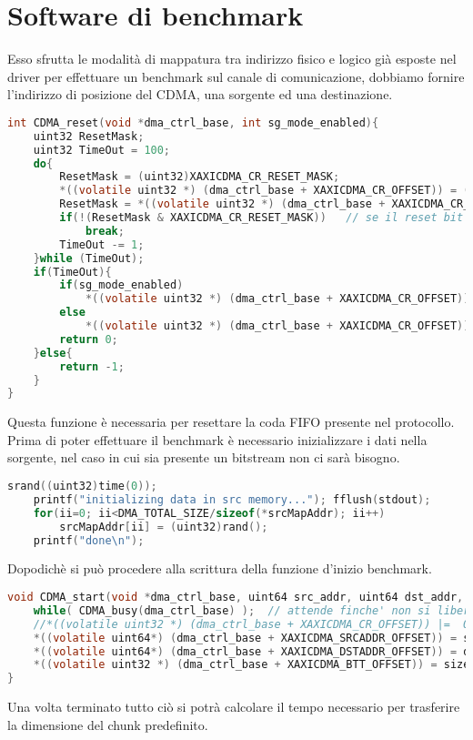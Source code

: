 \section{Software di benchmark}
\label{benchmark}
Esso sfrutta le modalità di mappatura tra indirizzo fisico e logico già esposte nel driver per effettuare un benchmark sul canale di comunicazione, dobbiamo fornire l'indirizzo di posizione del CDMA, una sorgente ed una destinazione.
\begin{lstlisting}[language=c, label=lst:sh, caption={reset CDMA}]
int CDMA_reset(void *dma_ctrl_base, int sg_mode_enabled){
    uint32 ResetMask;
    uint32 TimeOut = 100;
    do{
        ResetMask = (uint32)XAXICDMA_CR_RESET_MASK;
        *((volatile uint32 *) (dma_ctrl_base + XAXICDMA_CR_OFFSET)) = (uint32)ResetMask;
        ResetMask = *((volatile uint32 *) (dma_ctrl_base + XAXICDMA_CR_OFFSET));
        if(!(ResetMask & XAXICDMA_CR_RESET_MASK))   // se il reset bit e' 1 non e' ancora pronto
            break;
        TimeOut -= 1;
    }while (TimeOut);
    if(TimeOut){
        if(sg_mode_enabled)
            *((volatile uint32 *) (dma_ctrl_base + XAXICDMA_CR_OFFSET)) |=  0x00000008;
        else
            *((volatile uint32 *) (dma_ctrl_base + XAXICDMA_CR_OFFSET)) &= ~0x00000008;
        return 0;
    }else{
        return -1;
    }
}
\end{lstlisting}
Questa funzione è necessaria per resettare la coda FIFO presente nel protocollo.\\
Prima di poter effettuare il benchmark è necessario inizializzare i dati nella sorgente, nel caso in cui sia presente un bitstream non ci sarà bisogno.
\begin{lstlisting}[language=c, label=lst:sh, caption={Inizializzazione sorgente}]
    srand((uint32)time(0));
    printf("initializing data in src memory..."); fflush(stdout);
    for(ii=0; ii<DMA_TOTAL_SIZE/sizeof(*srcMapAddr); ii++)
        srcMapAddr[ii] = (uint32)rand();
    printf("done\n");
\end{lstlisting}
Dopodichè si può procedere alla scrittura della funzione d'inizio benchmark.
\begin{lstlisting}[language=c, label=lst:sh, caption={start del test CDMA}]
void CDMA_start(void *dma_ctrl_base, uint64 src_addr, uint64 dst_addr, uint32 size){
    while( CDMA_busy(dma_ctrl_base) );  // attende finche' non si libera il CDMA
    //*((volatile uint32 *) (dma_ctrl_base + XAXICDMA_CR_OFFSET)) |=  0x00007000;       // si dice al CDMA che deve accettare gli interrupt
    *((volatile uint64*) (dma_ctrl_base + XAXICDMA_SRCADDR_OFFSET)) = src_addr;     // Si imposta la sorgente
    *((volatile uint64*) (dma_ctrl_base + XAXICDMA_DSTADDR_OFFSET)) = dst_addr;     // La destinazione
    *((volatile uint32 *) (dma_ctrl_base + XAXICDMA_BTT_OFFSET)) = size;              // Si scrive un blocco della lunghezza predefinita
}
\end{lstlisting}
Una volta terminato tutto ciò si potrà calcolare il tempo necessario per trasferire la dimensione del chunk predefinito.\\
